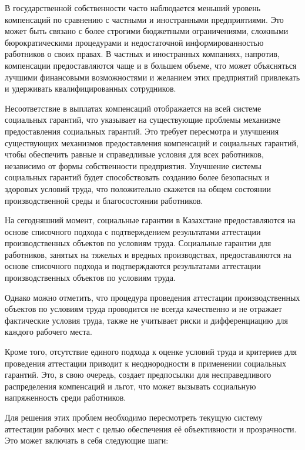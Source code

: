В государственной собственности часто наблюдается меньший уровень
компенсаций по сравнению с частными и иностранными предприятиями. Это
может быть связано с более строгими бюджетными ограничениями, сложными
бюрократическими процедурами и недостаточной информированностью
работников о своих правах. В частных и иностранных компаниях, напротив,
компенсации предоставляются чаще и в большем объеме, что может
объясняться лучшими финансовыми возможностями и желанием этих
предприятий привлекать и удерживать квалифицированных сотрудников.

Несоответствие в выплатах компенсаций отображается на всей системе
социальных гарантий, что указывает на существующие проблемы механизме
предоставления социальных гарантий. Это требует пересмотра и улучшения
существующих механизмов предоставления компенсаций и социальных
гарантий, чтобы обеспечить равные и справедливые условия для всех
работников, независимо от формы собственности предприятия. Улучшение
системы социальных гарантий будет способствовать созданию более
безопасных и здоровых условий труда, что положительно скажется на общем
состоянии производственной среды и благосостоянии работников.

На сегодняшний момент, социальные гарантии в Казахстане предоставляются
на основе списочного подхода с подтверждением результатами аттестации
производственных объектов по условиям труда. Социальные гарантии для
работников, занятых на тяжелых и вредных производствах, предоставляются
на основе списочного подхода и подтверждаются результатами аттестации
производственных объектов по условиям труда.

Однако можно отметить, что процедура проведения аттестации
производственных объектов по условиям труда проводится не всегда
качественно и не отражает фактические условия труда, также не учитывает
риски и дифференциацию для каждого рабочего места.

Кроме того, отсутствие единого подхода к оценке условий труда и
критериев для проведения аттестации приводит к неоднородности в
применении социальных гарантий. Это, в свою очередь, создает предпосылки
для несправедливого распределения компенсаций и льгот, что может
вызывать социальную напряженность среди работников.

Для решения этих проблем необходимо пересмотреть текущую систему
аттестации рабочих мест с целью обеспечения её объективности и
прозрачности. Это может включать в себя следующие шаги:

